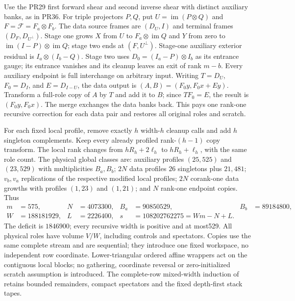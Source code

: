 \documentclass[11pt]{article}
\begin{document}
Use the PR29 first forward shear and second inverse shear with distinct
auxiliary banks, as in PR36. For triple projectors $P,Q$, put
$U=\operatorname{im}(P\otimes Q)$ and $F=\mathcal F=F_a\otimes F_b$.
The data source frames are $(D_U,I)$ and terminal frames
$(D_F,D_{U^\perp})$. Stage one grows $X$ from $U$ to
$F_a\otimes\operatorname{im}Q$ and $Y$ from zero to
$\operatorname{im}(I-P)\otimes\operatorname{im}Q$;
stage two ends at $(F,U^\perp)$.
Stage-one auxiliary exterior residual is $I_a\otimes(I_b-Q)$.
Stage two uses $D_0=(I_a-P)\otimes I_b$ as its entrance gauge;
its entrance vanishes and its cleanup leaves an exit of rank $m-b$.
Every auxiliary endpoint is full interchange on arbitrary input.
Writing $T=D_U$, $F_0=D_I$, and $E=D_{I-U}$, the data output is
$(A,B)=(F_0y,F_0x+Ey)$. Transform a full-role copy of $A$ by $T$
and add it to $B$; since $TF_0=E$, the result is $(F_0y,F_0x)$.
The merge exchanges the data banks back. This pays one rank-one recursive
correction for each data pair and restores all original roles and scratch.

For each fixed local profile, remove exactly $h$ width-$h$ cleanup calls
and add $h$ singleton complements. Keep every already profiled rank-$(h-1)$
copy transform. The local rank changes from $hR_h+2\ell_h$ to
$hR_h+\ell_h$, with the same role count. The physical global classes are:
auxiliary profiles $(25,525)$ and $(23,529)$ with multiplicities $B_a,B_b$;
$2N$ data profiles $26$ singletons plus $21,481$; $v_b,v_a$ replications
of the respective modified local profiles; $2N$ corank-one data growths
with profiles $(1,23)$ and $(1,21)$; and $N$ rank-one endpoint copies.
Thus
\[
\begin{aligned}
 m&=575,&N&=4073300,&B_a&=90850529,&B_b&=89184800,\\
 W&=188181929,&L&=2226400,&s&=108202762275=Wm-N+L.
\end{aligned}
\]
The deficit is $1846900$; every recursive width is positive and at most529.
All physical roles have volume $V/W$, including controls and spectators.
Copies use the same complete stream and are sequential; they introduce
one fixed workspace, no independent row coordinate. Lower-triangular
ordered affine wrappers act on the contiguous local blocks; no gathering,
coordinate reversal or zero-initialized scratch assumption is introduced.
The complete-row mixed-width induction of
 retains bounded remainders, compact
spectators and the fixed depth-first stack tapes.
\end{document}
